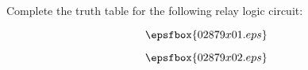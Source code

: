 

Complete the truth table for the following relay logic circuit:

$$\epsfbox{02879x01.eps}$$







$$\epsfbox{02879x02.eps}$$











